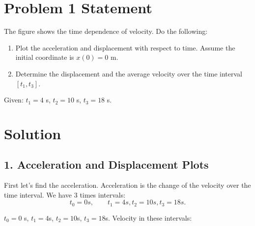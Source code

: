 \documentclass{article}
\begin{document}


\section*{Problem 1 Statement}
The figure shows the time dependence of velocity. Do the following:

\begin{enumerate}
    \item Plot the acceleration and displacement with respect to time. Assume the initial coordinate is $x(0) = 0$ m.
    \item Determine the displacement and the average velocity over the time interval $[t_1, t_3]$.
\end{enumerate}

Given: $t_1 = 4$ s, $t_2 = 10$ s, $t_3 = 18$ s.

\section*{Solution}

\subsection*{1. Acceleration and Displacement Plots}
First let's find the acceleration. Acceleration is the change of the velocity over the time interval.
We have 3 times intervals: 
\[
t_0 = 0s,\qquad t_1 = 4s, t_2 = 10s, t_3 = 18s.
\]

$t_0 = 0$ s, $t_1 = 4$s, $t_2 = 10$s, $t_3 = 18$s.
Velocity in these intervals: 
\end{document}
